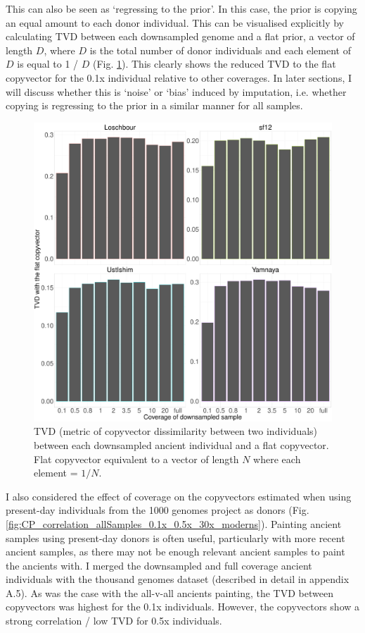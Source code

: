 This can also be seen as `regressing to the prior'. In this case, the prior is copying an equal amount to each donor individual. This can be visualised explicitly by calculating TVD between each downsampled genome and a flat prior, a vector of length $D$, where $D$ is the total number of donor individuals and each element of $D$ is equal to 1 / $D$ (Fig. \ref{fig:TVD_ancients_flat_prior}). This clearly shows the reduced TVD to the flat copyvector for the 0.1x individual relative to other coverages. In later sections, I will discuss whether this is `noise' or `bias' induced by imputation, i.e.  whether copying is regressing to the prior in a similar manner for all samples. 

\begin{figure}[htp]
    \centering
    \includegraphics[width=1.0\textwidth]{../images/chapter1/TVD_ancients_flat_prior.pdf}
    \caption{TVD (metric of copyvector dissimilarity between two individuals) between each downsampled ancient individual and a flat copyvector. Flat copyvector equivalent to a vector of length $N$ where each element = $1/N$.}
    \label{fig:TVD_ancients_flat_prior}
\end{figure}

I also considered the effect of coverage on the copyvectors estimated when using present-day individuals from the 1000 genomes project as donors (Fig. \ref{fig:CP_correlation_allSamples_0.1x_0.5x_30x_moderns}). Painting ancient samples using present-day donors is often useful, particularly with more recent ancient samples, as there may not be enough relevant ancient samples to paint the ancients with. I merged the downsampled and full coverage ancient individuals with the thousand genomes dataset (described in detail in appendix A.5). As was the case with the all-v-all ancients painting, the TVD between copyvectors was highest for the 0.1x individuals. However, the copyvectors show a strong correlation / low TVD for 0.5x individuals. 

